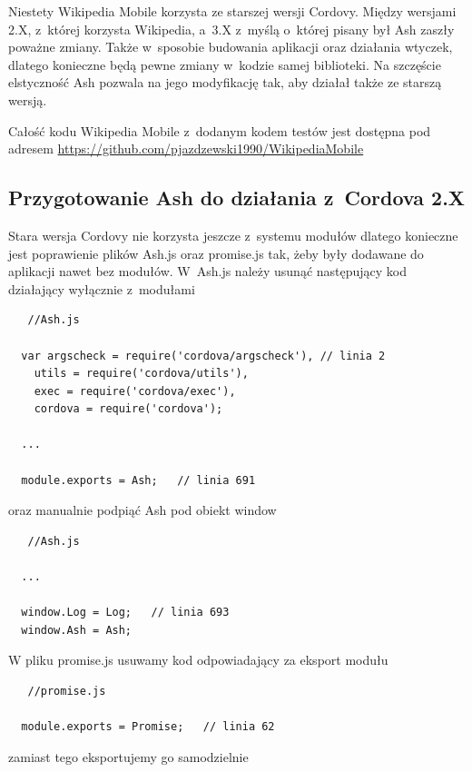 \documentclass[brudnopis]{xmgr}
\begin{document}
Niestety Wikipedia Mobile korzysta ze starszej wersji Cordovy. Między wersjami 2.X, z~której korzysta Wikipedia, a~3.X z~myślą o~której pisany był Ash zaszły poważne zmiany. Także w~sposobie budowania aplikacji oraz działania wtyczek, dlatego konieczne będą pewne zmiany w~kodzie samej biblioteki. Na szczęście elstyczność Ash pozwala na jego modyfikację tak, aby działał także ze starszą wersją.

Całość kodu Wikipedia Mobile z~dodanym kodem testów jest dostępna pod adresem \url{https://github.com/pjazdzewski1990/WikipediaMobile} 

\subsection{Przygotowanie Ash do działania z~Cordova 2.X}
  
Stara wersja Cordovy nie korzysta jeszcze z~systemu modułów dlatego konieczne jest poprawienie plików Ash.js oraz promise.js tak, żeby były dodawane do aplikacji nawet bez modułów.  W~Ash.js należy usunąć następujący kod działający wyłącznie z~modułami

\begin{lstlisting}
   //Ash.js
  
  var argscheck = require('cordova/argscheck'), // linia 2
    utils = require('cordova/utils'),
    exec = require('cordova/exec'),
    cordova = require('cordova');

  ...

  module.exports = Ash;   // linia 691

\end{lstlisting}

oraz manualnie podpiąć Ash pod obiekt window

\begin{lstlisting}
   //Ash.js

  ...

  window.Log = Log;   // linia 693
  window.Ash = Ash;

\end{lstlisting}

W pliku promise.js usuwamy kod odpowiadający za eksport modułu

\begin{lstlisting}
   //promise.js
 
  module.exports = Promise;   // linia 62 

\end{lstlisting}

zamiast tego eksportujemy go samodzielnie 
\end{document}
